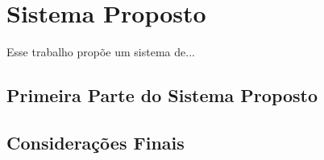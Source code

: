 \chapter{Sistema Proposto}\label{cap:proposta}

Esse trabalho propõe um sistema de... 


\section{Primeira Parte do Sistema Proposto}

\section{Considerações Finais}
